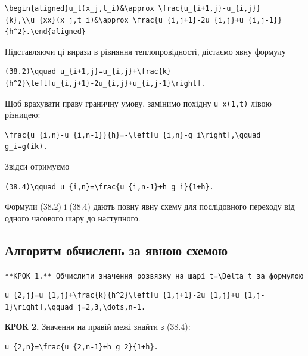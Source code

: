 \documentclass[
  ukrainian,
]{article}
\begin{document}
\begin{verbatim}
\begin{aligned}u_t(x_j,t_i)&\approx \frac{u_{i+1,j}-u_{i,j}}{k},\\u_{xx}(x_j,t_i)&\approx \frac{u_{i,j+1}-2u_{i,j}+u_{i,j-1}}{h^2}.\end{aligned}
\end{verbatim}

Підставляючи ці вирази в рівняння теплопровідності, дістаємо явну
формулу

\begin{verbatim}
(38.2)\qquad u_{i+1,j}=u_{i,j}+\frac{k}{h^2}\left[u_{i,j+1}-2u_{i,j}+u_{i,j-1}\right].
\end{verbatim}

Щоб врахувати праву граничну умову, замінимо похідну \texttt{u\_x(1,t)}
лівою різницею:

\begin{verbatim}
\frac{u_{i,n}-u_{i,n-1}}{h}=-\left[u_{i,n}-g_i\right],\qquad g_i=g(ik).
\end{verbatim}

Звідси отримуємо

\begin{verbatim}
(38.4)\qquad u_{i,n}=\frac{u_{i,n-1}+h g_i}{1+h}.
\end{verbatim}

Формули (38.2) і (38.4) дають повну явну схему для послідовного переходу
від одного часового шару до наступного.

\subsection{Алгоритм обчислень за явною
схемою}\label{ux430ux43bux433ux43eux440ux438ux442ux43c-ux43eux431ux447ux438ux441ux43bux435ux43dux44c-ux437ux430-ux44fux432ux43dux43eux44e-ux441ux445ux435ux43cux43eux44e}

\texttt{**КРОК\ 1.**\ Обчислити\ значення\ розв\textquotesingle{}язку\ на\ шарі\ \textquotesingle{}t=\textbackslash{}Delta\ t\textquotesingle{}\ за\ формулою}

\begin{verbatim}
u_{2,j}=u_{1,j}+\frac{k}{h^2}\left[u_{1,j+1}-2u_{1,j}+u_{1,j-1}\right],\qquad j=2,3,\dots,n-1.
\end{verbatim}

\textbf{КРОК 2.} Значення на правій межі знайти з (38.4):

\begin{verbatim}
u_{2,n}=\frac{u_{2,n-1}+h g_2}{1+h}.
\end{verbatim}
\end{document}
